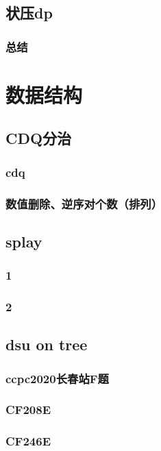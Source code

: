 \documentclass[10pt,a4paper]{article}
\begin{document}
\subsection{状压dp}
\subsubsection{总结}

\section{数据结构}
\subsection{CDQ分治}
\subsubsection{cdq}

\subsubsection{数值删除、逆序对个数（排列）}

\subsection{splay}
\subsubsection{1}

\subsubsection{2}

\subsection{dsu on tree}
\subsubsection{ccpc2020长春站F题}

\subsubsection{CF208E}

\subsubsection{CF246E}

\end{document}
